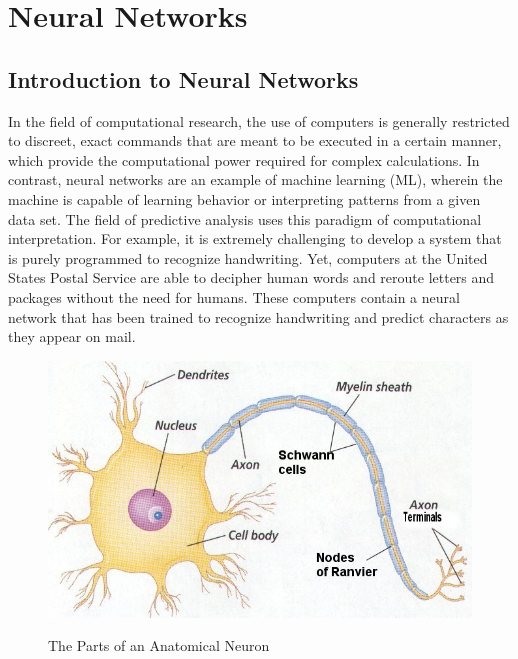 \chapter{Neural Networks}
\section{Introduction to Neural Networks}

In the field of computational research, the use of computers is generally restricted to discreet, exact commands that are meant to be executed in a certain manner, which  provide the computational power required for complex calculations.
In contrast, neural networks are an example of machine learning (ML), wherein the machine is capable of learning behavior or interpreting patterns from a given data set.
The field of predictive analysis uses this paradigm of computational interpretation.
For example, it is extremely challenging to develop a system that is purely programmed to recognize handwriting.
Yet, computers at the United States Postal Service are able to decipher human words and reroute letters and packages without the need for humans.
These computers contain a neural network that has been trained to recognize handwriting and predict characters as they appear on mail. \cite{nielsen} 

\begin{figure}[h]
   \centering
      \caption{The Parts of an Anatomical Neuron}
   \includegraphics[scale=0.75]{pictures/NeuralNetworks/neuron.jpg} 
   \label{fig:neuron}
\end{figure}

